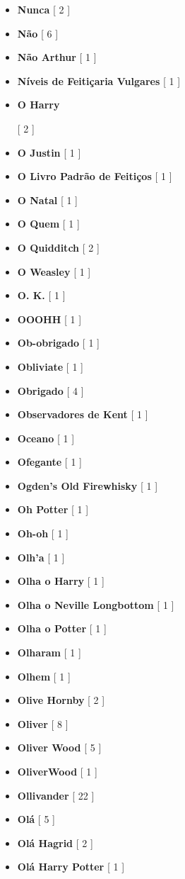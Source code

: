 \documentclass[a4paper]{article}
\begin{document}
\begin{itemize}
	\item \textbf{Nunca} [ 2 ]
	\item \textbf{Não} [ 6 ]
	\item \textbf{Não Arthur} [ 1 ]
	\item \textbf{Níveis de Feitiçaria Vulgares} [ 1 ]
	\item \hypertarget{O}{\textbf{O Harry}} [ 2 ]
	\item \textbf{O Justin} [ 1 ]
	\item \textbf{O Livro Padrão de Feitiços} [ 1 ]
	\item \textbf{O Natal} [ 1 ]
	\item \textbf{O Quem} [ 1 ]
	\item \textbf{O Quidditch} [ 2 ]
	\item \textbf{O Weasley} [ 1 ]
	\item \textbf{O. K.} [ 1 ]
	\item \textbf{OOOHH} [ 1 ]
	\item \textbf{Ob-obrigado} [ 1 ]
	\item \textbf{Obliviate} [ 1 ]
	\item \textbf{Obrigado} [ 4 ]
	\item \textbf{Observadores de Kent} [ 1 ]
	\item \textbf{Oceano} [ 1 ]
	\item \textbf{Ofegante} [ 1 ]
	\item \textbf{Ogden's Old Firewhisky} [ 1 ]
	\item \textbf{Oh Potter} [ 1 ]
	\item \textbf{Oh-oh} [ 1 ]
	\item \textbf{Olh'a} [ 1 ]
	\item \textbf{Olha o Harry} [ 1 ]
	\item \textbf{Olha o Neville Longbottom} [ 1 ]
	\item \textbf{Olha o Potter} [ 1 ]
	\item \textbf{Olharam} [ 1 ]
	\item \textbf{Olhem} [ 1 ]
	\item \textbf{Olive Hornby} [ 2 ]
	\item \textbf{Oliver} [ 8 ]
	\item \textbf{Oliver Wood} [ 5 ]
	\item \textbf{OliverWood} [ 1 ]
	\item \textbf{Ollivander} [ 22 ]
	\item \textbf{Olá} [ 5 ]
	\item \textbf{Olá Hagrid} [ 2 ]
	\item \textbf{Olá Harry Potter} [ 1 ]

\end{itemize}
\end{document}
